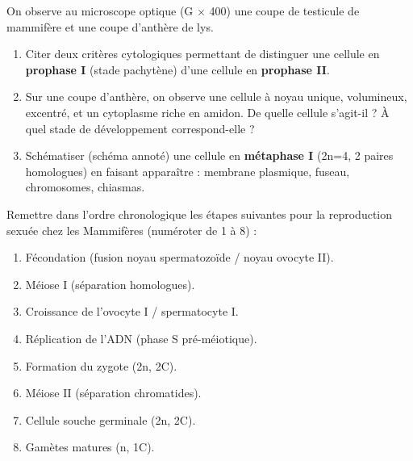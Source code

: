 \documentclass[11pt]{article}
\begin{document}
\begin{exercice}
On observe au microscope optique (G $\times$ 400) une coupe de testicule de mammifère et une coupe d'anthère de lys.
\begin{enumerate}
    \item Citer deux critères cytologiques permettant de distinguer une cellule en \textbf{prophase I} (stade pachytène) d'une cellule en \textbf{prophase II}.
    \item Sur une coupe d'anthère, on observe une cellule à noyau unique, volumineux, excentré, et un cytoplasme riche en amidon. De quelle cellule s'agit-il ? À quel stade de développement correspond-elle ?
    \item Schématiser (schéma annoté) une cellule en \textbf{métaphase I} (2n=4, 2 paires homologues) en faisant apparaître : membrane plasmique, fuseau, chromosomes, chiasmas.
\end{enumerate}
\end{exercice}

\begin{exercice}
Remettre dans l'ordre chronologique les étapes suivantes pour la reproduction sexuée chez les Mammifères (numéroter de 1 à 8) :
\begin{enumerate}
    \item Fécondation (fusion noyau spermatozoïde / noyau ovocyte II).
    \item Méiose I (séparation homologues).
    \item Croissance de l'ovocyte I / spermatocyte I.
    \item Réplication de l'ADN (phase S pré-méiotique).
    \item Formation du zygote (2n, 2C).
    \item Méiose II (séparation chromatides).
    \item Cellule souche germinale (2n, 2C).
    \item Gamètes matures (n, 1C).
\end{enumerate}
\end{exercice}
\end{document}
